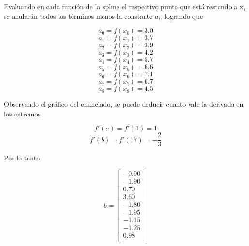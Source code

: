 Evaluando en cada función de la spline el respectivo punto que está restando a x, se anularán todos los términos menos la constante $a_i$, logrando que

\begin{equation}
    a_0=f(x_0)=3.0
\end{equation}  
\begin{equation}
    a_1=f(x_1)=3.7
\end{equation}
\begin{equation}
    a_2=f(x_2)=3.9
\end{equation}
\begin{equation}
    a_3=f(x_3)=4.2
\end{equation}
\begin{equation}
    a_4=f(x_4)=5.7
\end{equation}
\begin{equation}
    a_5=f(x_5)=6.6
\end{equation}
\begin{equation}
    a_6=f(x_6)=7.1
\end{equation}
\begin{equation}
    a_7=f(x_7)=6.7
\end{equation}
\begin{equation}
    a_8=f(x_8)=4.5
\end{equation}

Observando el gráfico del enunciado, se puede deducir cuanto vale la derivada en los extremos

\begin{equation}
    f'(a)=f'(1)=1
\end{equation}
\begin{equation}
    f'(b)=f'(17)=-\frac{2}{3}
\end{equation}

Por lo tanto

\begin{equation}
    b=\begin{bmatrix}
    -0.90 \\
    -1.90 \\
    0.70 \\
    3.60 \\
    -1.80 \\
    -1.95 \\
    -1.15 \\
    -1.25 \\
    0.98 \\
    \end{bmatrix}
\end{equation}

